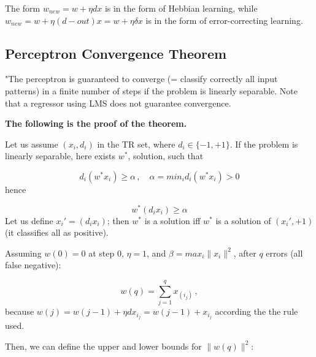 The form $w_{new} = w + \eta d x$ is in the form of Hebbian learning, while $w_{new} = w + \eta (d-out) x = w + \eta \delta x$ is in the form of error-correcting learning.

\subsection{Perceptron Convergence Theorem}

"The perceptron is guaranteed to converge (= classify correctly all input patterns) in a finite number of steps if the problem is linearly separable. Note that a regressor using LMS does not guarantee convergence.

\textbf{The following is the proof of the theorem.}

Let us assume $(x_i, d_i)$ in the TR set, where $d_i \in \{-1,+1\}$. If the problem is linearly separable, here exists $w^*$, solution, such that

\begin{equation*}
    d_i(w^*x_i) \geq \alpha \, , \quad \alpha=min_id_i(w^*x_i) > 0
\end{equation*}
hence

\begin{equation*}
    w^*(d_ix_i) \geq \alpha
\end{equation*}
Let us define $x_i' = (d_ix_i)$; then $w^*$ is a solution iff $w^*$ is a solution of $(x_i', +1)$ (it classifies all as positive).

Assuming $w(0) = 0$ at step 0, $\eta = 1$, and $\beta = max_i\|x_i\|^2$, after $q$ errors (all false negative):

\begin{equation*}
    w(q) = \sum_{j=1}^q x_{(i_j)} \, ,
\end{equation*}
because $w(j) = w(j-1) + \eta d x_{i_j} = w(j-1) + x_{i_j}$ according the the rule used.

Then, we can define the upper and lower bounds for $\|w(q)\|^2$:

